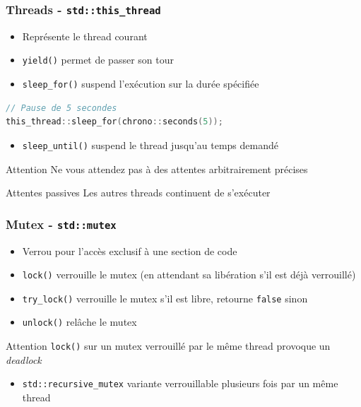 \documentclass[C++.tex]{subfiles}
\begin{document}
\begin{frame}[fragile]
	\frametitle{Threads - \lstinline|std::this_thread|}
	\begin{itemize}
		\item Représente le thread courant
		\item \lstinline|yield()| permet de \og passer son tour\fg{}


		\item \lstinline|sleep_for()| suspend l'exécution sur la durée spécifiée
	\end{itemize}

	\begin{lstlisting}[language=C++]
// Pause de 5 secondes
this_thread::sleep_for(chrono::seconds(5));\end{lstlisting}

	\begin{itemize}
		\item \lstinline|sleep_until()| suspend le thread jusqu'au temps demandé
	\end{itemize}

	\begin{alertblock}{Attention}
		Ne vous attendez pas à des attentes arbitrairement précises

	\end{alertblock}

	\begin{block}{Attentes passives}
		Les autres threads continuent de s'exécuter
	\end{block}
\end{frame}

\begin{frame}[fragile]
	\frametitle{Mutex - \lstinline|std::mutex|}
	\begin{itemize}
		\item Verrou pour l'accès exclusif à une section de code
		\item \lstinline|lock()| verrouille le mutex (en attendant sa libération s'il est déjà verrouillé)
		\item \lstinline|try_lock()| verrouille le mutex s'il est libre, retourne \lstinline|false| sinon
		\item \lstinline|unlock()| relâche le mutex
	\end{itemize}

	\begin{alertblock}{Attention}
		\lstinline|lock()| sur un mutex verrouillé par le même thread provoque un \textit{deadlock}
	\end{alertblock}

	\begin{itemize}
		\item \lstinline|std::recursive_mutex| variante verrouillable plusieurs fois par un même thread

	\end{itemize}
\end{frame}
\end{document}
